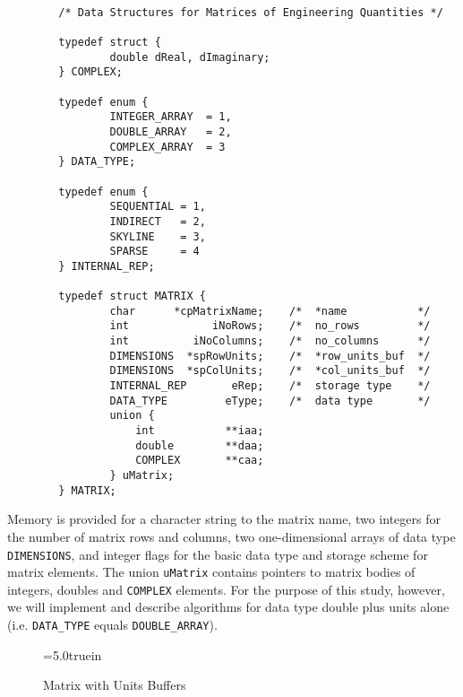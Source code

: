 \begin{footnotesize}
\begin{verbatim}

        /* Data Structures for Matrices of Engineering Quantities */

        typedef struct {
                double dReal, dImaginary;
        } COMPLEX;

        typedef enum {
                INTEGER_ARRAY  = 1,
                DOUBLE_ARRAY   = 2,
                COMPLEX_ARRAY  = 3
        } DATA_TYPE;

        typedef enum {
                SEQUENTIAL = 1,
                INDIRECT   = 2,
                SKYLINE    = 3,
                SPARSE     = 4
        } INTERNAL_REP;

        typedef struct MATRIX {
                char      *cpMatrixName;    /*  *name           */
                int             iNoRows;    /*  no_rows         */
                int          iNoColumns;    /*  no_columns      */
                DIMENSIONS  *spRowUnits;    /*  *row_units_buf  */
                DIMENSIONS  *spColUnits;    /*  *col_units_buf  */
                INTERNAL_REP       eRep;    /*  storage type    */ 
                DATA_TYPE         eType;    /*  data type       */
                union {
                    int           **iaa;
                    double        **daa;   
                    COMPLEX       **caa;
                } uMatrix;
        } MATRIX;
\end{verbatim}
\end{footnotesize}

\vspace{0.15 in}\noindent
Memory is provided for a character string to the matrix name,
two integers for the number of matrix rows and columns,
two one-dimensional arrays of data type {\tt DIMENSIONS},
and integer flags for the basic data type and storage scheme for matrix elements.
The union {\tt uMatrix} contains pointers to matrix
bodies of integers, doubles and {\tt COMPLEX} elements.
For the purpose of this study, however, we will implement and
describe algorithms for data type double plus units
alone (i.e. {\tt DATA\_TYPE} equals {\tt DOUBLE\_ARRAY}).

\begin{figure}[h]
\epsfxsize=5.0truein
\centerline{}
\caption{Matrix with Units Buffers}
\label{fig: Units_Buffer}
\end{figure}

